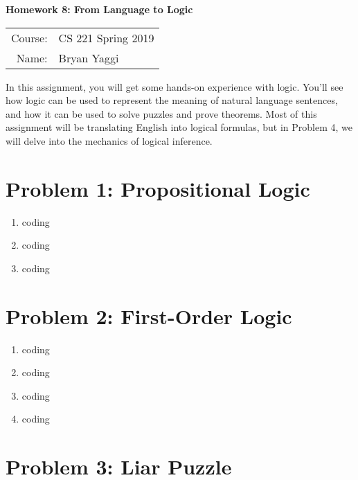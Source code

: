 \documentclass[10pt]{article}
\begin{document}
\begin{center}
{\Large \textbf{Homework 8: From Language to Logic}}

\begin{tabular}{rl}
\\
Course: & CS 221 Spring 2019 \\
Name: & Bryan Yaggi
\end{tabular}
\end{center}

In this assignment, you will get some hands-on experience with logic. You'll see how logic can be used to represent the meaning of natural language sentences, and how it can be used to solve puzzles and prove theorems. Most of this assignment will be translating English into logical formulas, but in Problem 4, we will delve into the mechanics of logical inference.

\section*{\normalsize Problem 1: Propositional Logic}

\begin{enumerate}[label=(\alph*)]

	\item coding
	
	\item coding
	
	\item coding

\end{enumerate}

\section*{\normalsize Problem 2: First-Order Logic}

\begin{enumerate}[label=(\alph*)]

  \item coding
  
  \item coding
  
  \item coding
  
  \item coding

\end{enumerate}

\section*{\normalsize Problem 3: Liar Puzzle}
\end{document}
